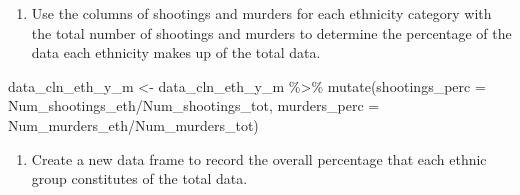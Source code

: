 \documentclass[
]{article}
\newenvironment{Shaded}{\begin{snugshade}}{\end{snugshade}}
\newcommand{\AttributeTok}[1]{\textcolor[rgb]{0.77,0.63,0.00}{#1}}
\newcommand{\FunctionTok}[1]{\textcolor[rgb]{0.00,0.00,0.00}{#1}}
\newcommand{\NormalTok}[1]{#1}
\newcommand{\OtherTok}[1]{\textcolor[rgb]{0.56,0.35,0.01}{#1}}
\newcommand{\SpecialCharTok}[1]{\textcolor[rgb]{0.00,0.00,0.00}{#1}}
\providecommand{\tightlist}{%
  \setlength{\itemsep}{0pt}\setlength{\parskip}{0pt}}
\begin{document}
\begin{enumerate}
\def\labelenumi{\arabic{enumi}.}
\setcounter{enumi}{4}
\tightlist
\item
  Use the columns of shootings and murders for each ethnicity category
  with the total number of shootings and murders to determine the
  percentage of the data each ethnicity makes up of the total data.
\end{enumerate}

\begin{Shaded}
\begin{Highlighting}[]
\NormalTok{data\_cln\_eth\_y\_m }\OtherTok{\textless{}{-}}\NormalTok{ data\_cln\_eth\_y\_m }\SpecialCharTok{\%\textgreater{}\%} \FunctionTok{mutate}\NormalTok{(}\AttributeTok{shootings\_perc =}\NormalTok{ Num\_shootings\_eth}\SpecialCharTok{/}\NormalTok{Num\_shootings\_tot, }\AttributeTok{murders\_perc =}\NormalTok{ Num\_murders\_eth}\SpecialCharTok{/}\NormalTok{Num\_murders\_tot)}
\end{Highlighting}
\end{Shaded}

\begin{enumerate}
\def\labelenumi{\arabic{enumi}.}
\setcounter{enumi}{5}
\tightlist
\item
  Create a new data frame to record the overall percentage that each
  ethnic group constitutes of the total data.
\end{enumerate}

\begin{Shaded}
\end{Shaded}
\end{document}
